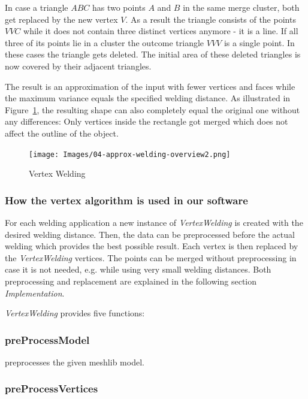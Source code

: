 \documentclass[../ClassicThesis.tex]{subfiles}
\begin{document}
In case a triangle $ABC$ has two points $A$ and $B$ in the same merge cluster, both get replaced by the new vertex $V$. As a result the triangle consists of the points $VVC$ while it does not contain three distinct vertices anymore - it is a line. If all three of its points lie in a cluster the outcome triangle $VVV$ is a single point. In these cases the triangle gets deleted. The initial area of these deleted triangles is now covered by their adjacent triangles.

The result is an approximation of the input with fewer vertices and faces while the maximum variance equals the specified welding distance. As illustrated in Figure~\ref{fig:vertex_welding}, the resulting shape can also completely equal the original one without any differences: Only vertices inside the rectangle got merged which does not affect the outline of the object.



\begin{figure}
\texttt{[image: Images/04-approx-welding-overview2.png]}
\caption{Vertex Welding}
\label{fig:vertex_welding}
\end{figure}

\subsubsection{How the vertex algorithm is used in our software}

For each welding application a new instance of \emph{VertexWelding} is created with the desired welding distance. Then, the data can be preprocessed before the actual welding which provides the best possible result. Each vertex is then replaced by the \emph{VertexWelding} vertices. The points can be merged without preprocessing in case it is not needed, e.g. while using very small welding distances. Both preprocessing and replacement are explained in the following section \emph{Implementation}.

\emph{VertexWelding} provides five functions:

\subsubsection*{preProcessModel}

preprocesses the given meshlib model.

\subsubsection*{preProcessVertices}
\end{document}
